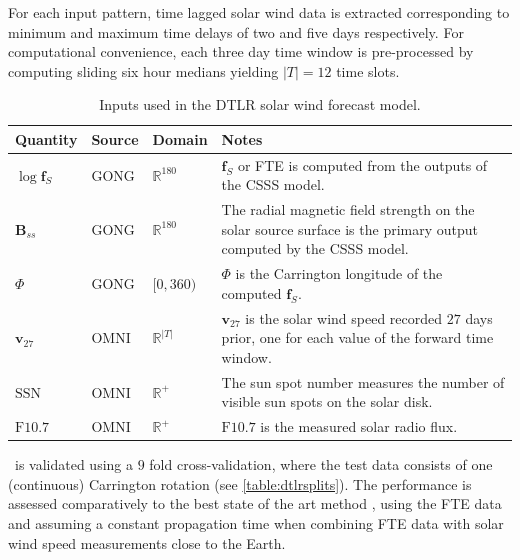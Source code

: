 For each input pattern, time lagged solar wind data is extracted corresponding to minimum and 
maximum time delays of two and five days respectively. For computational convenience, each three 
day time window is pre-processed by computing sliding six hour medians yielding $|T| = 12$ time 
slots.
%
\begin{table}[ht]
    \centering
    \begin{tabular}{l l l p{}}
        \hline
        \textbf{Quantity} & \textbf{Source} & \textbf{Domain} & \textbf{Notes}\\
        \hline
        \vspace{5pt}
          $\log \mathbf{f}_S$ & 
          GONG & 
          $\mathbb{R}^{180}$ & 
          $\mathbf{f}_S$ or FTE is computed from the outputs of the CSSS model.\\
          $\mathbf{B}_{ss}$ & 
          GONG & 
          $\mathbb{R}^{180}$  & 
          The radial magnetic field strength on the solar source surface is the primary output computed by the CSSS model.\\
          $\Phi$ & 
          GONG & 
          $[0, 360)$ & 
          $\Phi$ is the Carrington longitude of the computed $\mathbf{f}_S$.\\
          $\mathbf{v}_{27}$ & 
          OMNI & 
          $\mathbb{R}^{\rvert T \rvert}$ & 
          $\mathbf{v}_{27}$ is the solar wind speed recorded $27$ days prior, one for each value of the forward time window. \\
          $\mathrm{SSN}$ & OMNI & $\mathbb{R}^{+}$ & The sun spot number measures the number of visible sun spots on the solar disk. \\
          $\mathrm{F}10.7$ & OMNI & $\mathbb{R}^{+}$ & $\mathrm{F}10.7$ is the measured solar radio flux. \\
        \hline
    \end{tabular}
    \caption{Inputs used in the DTLR solar wind forecast model.}
    \label{table:dtlrInputs}
\end{table}
%
\XX\ is validated using a $9$ fold cross-validation, where the test data consists of one 
(continuous) Carrington rotation (see \cref{table:dtlrsplits}). The performance is assessed 
comparatively to the best state of the art method \citep{Poduval_2014,neuralnetsw}, using the FTE 
data and assuming a constant propagation time when combining FTE data with solar wind speed 
measurements close to the Earth. 
%
